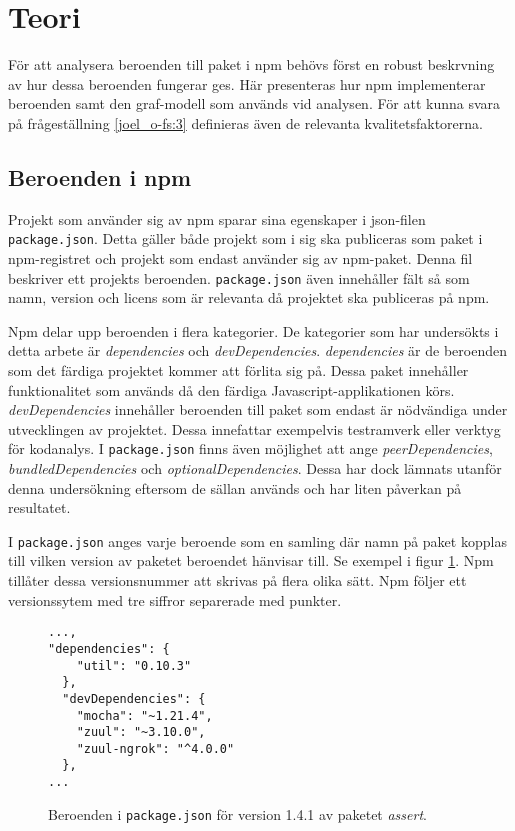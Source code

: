 \section{Teori}
\label{sec:joel_o-theory}
För att analysera beroenden till paket i npm behövs först en robust beskrvning av hur dessa beroenden fungerar ges. Här presenteras hur npm implementerar beroenden samt den graf-modell som används vid analysen. För att kunna svara på frågeställning \ref{joel_o-fs:3} definieras även de relevanta kvalitetsfaktorerna.

\subsection{Beroenden i npm}
Projekt som använder sig av npm sparar sina egenskaper i json-filen \texttt{package.json}\cite{npm-package.json}. Detta gäller både projekt som i sig ska publiceras som paket i npm-registret och projekt som endast använder sig av npm-paket.
Denna fil beskriver ett projekts beroenden. \texttt{package.json} även innehåller fält så som namn, version och licens som är relevanta då projektet ska publiceras på npm.

Npm delar upp beroenden i flera kategorier. De kategorier som har undersökts i detta arbete är \textit{dependencies} och \textit{devDependencies}. \textit{dependencies} är de beroenden som det färdiga projektet kommer att förlita sig på. Dessa paket innehåller funktionalitet som används då den färdiga Javascript-applikationen körs. \textit{devDependencies} innehåller beroenden till paket som endast är nödvändiga under utvecklingen av projektet. Dessa innefattar exempelvis testramverk eller verktyg för kodanalys. I \texttt{package.json} finns även möjlighet att ange \textit{peerDependencies}, \textit{bundledDependencies} och \textit{optionalDependencies}. Dessa har dock lämnats utanför denna undersökning eftersom de sällan används och har liten påverkan på resultatet.

I \texttt{package.json} anges varje beroende som en samling där namn på paket kopplas till vilken version av paketet beroendet hänvisar till. Se exempel i figur \ref{fig:package.json}. Npm tillåter dessa versionsnummer att skrivas på flera olika sätt. Npm följer ett versionssytem med tre siffror separerade med punkter.\cite{npm-semver}

\lstset{language=Java}
\begin{figure}[h]
  \center
  \begin{minipage}[c]{5cm}
    \begin{lstlisting}
...,
"dependencies": {
    "util": "0.10.3"
  },
  "devDependencies": {
    "mocha": "~1.21.4",
    "zuul": "~3.10.0",
    "zuul-ngrok": "^4.0.0"
  },
...
    \end{lstlisting}
  \end{minipage}
  \caption{Beroenden i \texttt{package.json} för version 1.4.1 av paketet \textit{assert}.\cite{npm-assert}}
  \label{fig:package.json}
\end{figure}

